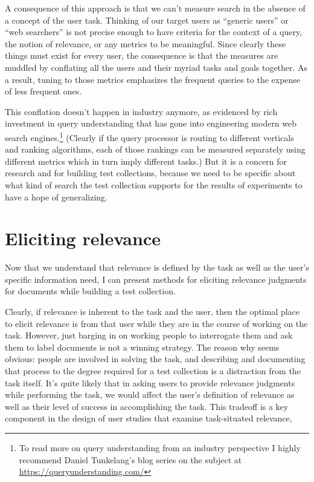 \documentclass[nobib]{tufte-book}
\begin{document}
A consequence of this approach is that we can't measure search in the absence of a concept of the user task.  Thinking of our target users as ``generic users'' or ``web searchers'' is not precise enough to have criteria for the context of a query, the notion of relevance, or any metrics to be meaningful.  Since clearly these things must exist for every user, the consequence is that the measures are muddled by conflating all the users and their myriad tasks and goals together.  As a result, tuning to those metrics emphasizes the frequent queries to the expense of less frequent ones.

This conflation doesn't happen in industry anymore, as evidenced by rich investment in query understanding that has gone into engineering modern web search engines.\footnote{To read more on query understanding from an industry perspective I highly recommend Daniel Tunkelang's blog series on the subject at \url{https://queryunderstanding.com/}} (Clearly if the query processor is routing to different verticals and ranking algorithms, each of those rankings can be measured separately using different metrics which in turn imply different tasks.)  But it is a concern for research and for building test collections, because we need to be specific about what kind of search the test collection supports for the results of experiments to have a hope of generalizing.

\chapter{Eliciting relevance}

Now that we understand that relevance is defined by the task as well as the user's specific information need, I can present methods for eliciting relevance judgments for documents while building a test collection.

Clearly, if relevance is inherent to the task and the user, then the optimal place to elicit relevance is from that user while they are in the course of working on the task.  However, just barging in on working people to interrogate them and ask them to label documents is not a winning strategy.  The reason why seems obvious: people are involved in solving the task, and describing and documenting that process to the degree required for a test collection is a distraction from the task itself.  It's quite likely that in asking users to provide relevance judgments while performing the task, we would affect the user's definition of relevance as well as their level of success in accomplishing the task.  This tradeoff is a key component in the design of user studies that examine task-situated relevance,
\end{document}
